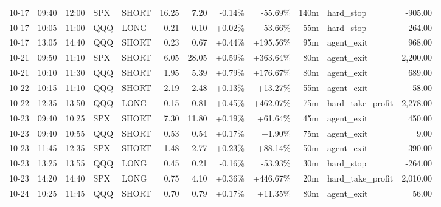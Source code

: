 \documentclass[11pt,a4paper,twoside]{article}
\begin{document}
\begin{center}
\begin{longtable}{>{\color{txtmain}}l l l l l r r r r r >{\color{txtmain}}l r}
10-17 & 09:40 & 12:00 & SPX & SHORT & 16.25 & 7.20 & \textcolor{lossred}{-0.14\%} & \textcolor{lossred}{-55.69\%} & 140m & hard\_stop & \textcolor{lossred}{-905.00} \\
10-17 & 10:05 & 11:00 & QQQ & LONG & 0.21 & 0.10 & \textcolor{wingreen}{+0.02\%} & \textcolor{lossred}{-53.66\%} & 55m & hard\_stop & \textcolor{lossred}{-264.00} \\
10-17 & 13:05 & 14:40 & QQQ & SHORT & 0.23 & 0.67 & \textcolor{wingreen}{+0.44\%} & \textcolor{wingreen}{+195.56\%} & 95m & agent\_exit & \textcolor{wingreen}{968.00} \\
10-21 & 09:50 & 11:10 & SPX & SHORT & 6.05 & 28.05 & \textcolor{wingreen}{+0.59\%} & \textcolor{wingreen}{+363.64\%} & 80m & agent\_exit & \textcolor{wingreen}{2,200.00} \\
10-21 & 10:10 & 11:30 & QQQ & SHORT & 1.95 & 5.39 & \textcolor{wingreen}{+0.79\%} & \textcolor{wingreen}{+176.67\%} & 80m & agent\_exit & \textcolor{wingreen}{689.00} \\
10-22 & 10:15 & 11:10 & QQQ & SHORT & 2.19 & 2.48 & \textcolor{wingreen}{+0.13\%} & \textcolor{wingreen}{+13.27\%} & 55m & agent\_exit & \textcolor{wingreen}{58.00} \\
10-22 & 12:35 & 13:50 & QQQ & LONG & 0.15 & 0.81 & \textcolor{wingreen}{+0.45\%} & \textcolor{wingreen}{+462.07\%} & 75m & hard\_take\_profit & \textcolor{wingreen}{2,278.00} \\
10-23 & 09:40 & 10:25 & SPX & SHORT & 7.30 & 11.80 & \textcolor{wingreen}{+0.19\%} & \textcolor{wingreen}{+61.64\%} & 45m & agent\_exit & \textcolor{wingreen}{450.00} \\
10-23 & 09:40 & 10:55 & QQQ & SHORT & 0.53 & 0.54 & \textcolor{wingreen}{+0.17\%} & \textcolor{wingreen}{+1.90\%} & 75m & agent\_exit & \textcolor{wingreen}{9.00} \\
10-23 & 11:45 & 12:35 & SPX & SHORT & 1.48 & 2.77 & \textcolor{wingreen}{+0.23\%} & \textcolor{wingreen}{+88.14\%} & 50m & agent\_exit & \textcolor{wingreen}{390.00} \\
10-23 & 13:25 & 13:55 & QQQ & LONG & 0.45 & 0.21 & \textcolor{lossred}{-0.16\%} & \textcolor{lossred}{-53.93\%} & 30m & hard\_stop & \textcolor{lossred}{-264.00} \\
10-23 & 14:20 & 14:40 & SPX & LONG & 0.75 & 4.10 & \textcolor{wingreen}{+0.36\%} & \textcolor{wingreen}{+446.67\%} & 20m & hard\_take\_profit & \textcolor{wingreen}{2,010.00} \\
10-24 & 10:25 & 11:45 & QQQ & SHORT & 0.70 & 0.79 & \textcolor{wingreen}{+0.17\%} & \textcolor{wingreen}{+11.35\%} & 80m & agent\_exit & \textcolor{wingreen}{56.00} \\

\end{longtable}
\end{center}
\end{document}
